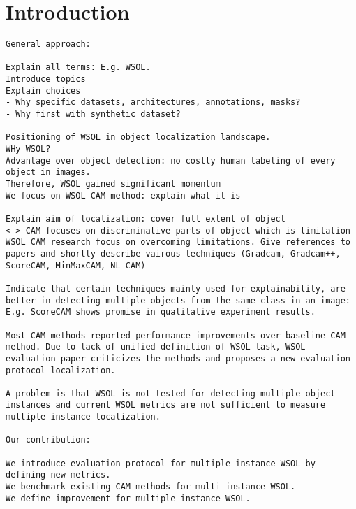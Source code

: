 \chapter{Introduction}

\begin{verbatim}
General approach:

Explain all terms: E.g. WSOL.
Introduce topics
Explain choices
- Why specific datasets, architectures, annotations, masks?
- Why first with synthetic dataset?

Positioning of WSOL in object localization landscape.
WHy WSOL? 
Advantage over object detection: no costly human labeling of every object in images.
Therefore, WSOL gained significant momentum 
We focus on WSOL CAM method: explain what it is

Explain aim of localization: cover full extent of object
<-> CAM focuses on discriminative parts of object which is limitation
WSOL CAM research focus on overcoming limitations. Give references to papers and shortly describe vairous techniques (Gradcam, Gradcam++, ScoreCAM, MinMaxCAM, NL-CAM)

Indicate that certain techniques mainly used for explainability, are better in detecting multiple objects from the same class in an image: E.g. ScoreCAM shows promise in qualitative experiment results.

Most CAM methods reported performance improvements over baseline CAM method. Due to lack of unified definition of WSOL task, WSOL evaluation paper criticizes the methods and proposes a new evaluation protocol localization. 

A problem is that WSOL is not tested for detecting multiple object instances and current WSOL metrics are not sufficient to measure multiple instance localization.

Our contribution:

We introduce evaluation protocol for multiple-instance WSOL by defining new metrics. 
We benchmark existing CAM methods for multi-instance WSOL.
We define improvement for multiple-instance WSOL.
\end{verbatim}
